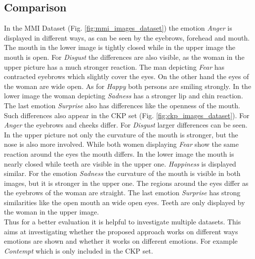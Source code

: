 \documentclass[10pt,journal,compsoc, hidelinks]{IEEEtran}
\begin{document}
\subsection{Comparison}
\label{sec:comparison}
In the MMI Dataset (Fig. \ref{fig:mmi_images_dataset}) the emotion \textit{Anger} is displayed in different ways, as can be seen by the eyebrows, forehead and mouth. The mouth in the lower image is tightly closed while in the upper image the mouth is open. For \textit{Disgust} the differences are also visible, as the woman in the upper picture has a much stronger reaction. The man depicting \textit{Fear} has contracted eyebrows which slightly cover the eyes. On the other hand the eyes of the woman are wide open. As for \textit{Happy} both persons are smiling strongly. In the lower image the woman depicting \textit{Sadness} has a stronger lip and chin reaction. The last emotion \textit{Surprise} also has differences like the openness of the mouth.\\

Such differences also appear in the CKP set (Fig. \ref{fig:ckp_images_dataset}). 
For \textit{Anger} the eyebrows and cheeks differ.
For \textit{Disgust} larger differences can be seen. In the upper picture not only the curvature of the mouth is stronger, but the nose is also more involved. While both women displaying \textit{Fear} show the same reaction around the eyes the mouth differs. In the lower image the mouth is nearly closed while teeth are visible in the upper one. \textit{Happiness} is displayed similar. For the emotion \textit{Sadness} the curvature of the mouth is visible in both images, but it is stronger in the upper one. The regions around the eyes differ as the eyebrows of the woman are straight. The last emotion \textit{Surprise} has strong similarities like the open mouth an wide open eyes. Teeth are only displayed by the woman in the upper image.\\
Thus for a better evaluation it is helpful to investigate multiple datasets. This aims at investigating whether the proposed approach works on different ways emotions are shown and whether it works on different emotions. For example \textit{Contempt} which is only included in the CKP set.
\end{document}
